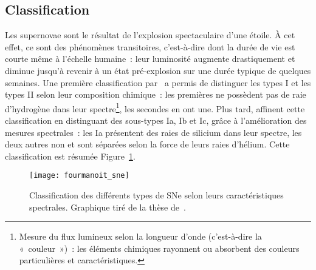 \documentclass[../main/main.tex]{subfiles}
\begin{document}
\subsection{Classification}\label{ssec:class} %

Les supernovae sont le résultat de l'explosion spectaculaire d'une étoile. À cet
effet, ce sont des phénomènes transitoires, c'est-à-dire dont la durée de vie
est courte même à l'échelle humaine~: leur luminosité augmente drastiquement et
diminue jusqu'à revenir à un état pré-explosion sur une durée typique de
quelques semaines. Une première classification par~\cite{minkowski1941} a permis
de distinguer les types I et les types II selon leur composition chimique~: les
premières ne possèdent pas de raie d'hydrogène dans leur spectre\footnote{Mesure
    du flux lumineux selon la longueur d'onde (c'est-à-dire la «~couleur~»)~:
    les éléments chimiques rayonnent ou absorbent des couleurs particulières et
caractéristiques.}, les secondes en ont une. Plus tard, \cite{elias1985}
affinent cette classification en distinguant des sous-types Ia, Ib et Ic,
grâce à l'amélioration des mesures spectrales~: les Ia présentent des raies
de silicium dans leur spectre, les deux autres non et sont séparées selon la
force de leurs raies d'hélium. Cette classification est résumée
Figure~\ref{fig:sne_class}.

\begin{figure}[ht]
    \centering
    \texttt{[image: fourmanoit\_sne]}
    \caption[Classification des différents types de SNe selon leurs
    caractéristiques spectrales]{Classification des différents types de SNe selon
        leurs caractéristiques spectrales. Graphique tiré de la thèse
    de~\cite{fourmanoit2010}.}\label{fig:sne_class}
\end{figure}
\end{document}
